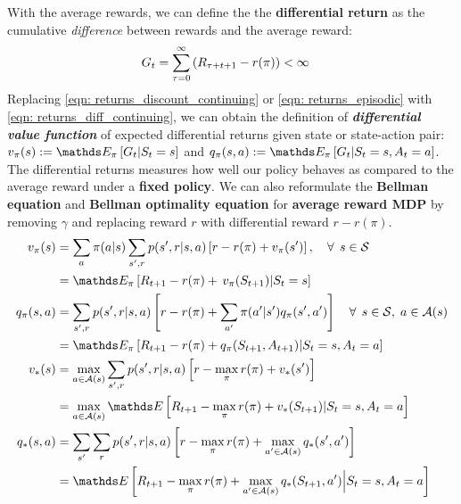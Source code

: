 \documentclass[11pt]{article}
\begin{document}
\begin{itemize}
With the average rewards, we can define the the \textbf{differential return} as the cumulative \emph{difference} between rewards and the average reward:
\begin{align}
G_{t} &= \sum_{\tau=0}^{\infty}\left(R_{\tau+t+1} - r(\pi)\right) < \infty \label{eqn: returns_diff_continuing}
\end{align}  Replacing \eqref{eqn: returns_discount_continuing} or \eqref{eqn: returns_episodic} with \eqref{eqn: returns_diff_continuing}, we can obtain the definition of \textbf{\emph{differential value function}} of expected differential returns given state or state-action pair: $v_{\pi}(s):= \E{\pi}{G_{t}  | S_{t}=s}$ and $q_{\pi}(s, a):= \E{\pi}{G_{t}  | S_{t}=s, A_{t}=a}$.  The differential returns measures how well our policy behaves as compared to the average reward under a \textbf{fixed policy}. We can also reformulate the \textbf{Bellman equation} and \textbf{Bellman optimality equation} for \textbf{average reward MDP} by removing $\gamma$ and replacing reward $r$ with differential reward $r-r(\pi)$.
\begin{align}
v_{\pi}(s) &= \sum_{a}\pi(a|s)\sum_{s', r}p(s', r| s, a)\brac{r - r(\pi) + v_{\pi}(s')}, \quad \forall\,\; s\in \cS \label{eqn: bellman_eqn_value_diff} \\
&= \E{\pi}{R_{t+1} - r(\pi)  + \,v_{\pi}(S_{t+1}) | S_{t} = s} \label{eqn: bellman_eqn_value_diff_2}\\
q_{\pi}(s, a) &=\sum_{s', r}p(s', r|s,a)\brac{r - r(\pi) +  \sum_{a'}\pi(a'|s')q_{\pi}(s', a')} \quad \forall\,\; s\in \cS, \; a\in \cA(s) \label{eqn: bellman_eqn_value_action_diff}\\
&=\E{\pi}{R_{t+1} - r(\pi)  + q_{\pi}(S_{t+1}, A_{t+1}) | S_{t}=s, A_{t}=a}  \label{eqn: bellman_eqn_value_action_diff_2}\\
v_{*}(s) &= \max_{a\in \cA(s)}\sum_{s', r}p(s', r|s, a)\brac{r - \max_{\pi}r(\pi) + v_{*}(s')} \label{eqn: bellman_opt_eqn_value_diff}\\
 &=  \max_{a\in \cA(s)}\E{}{R_{t+1} - \max_{\pi}r(\pi) + v_{*}(S_{t+1}) | S_{t}=s, A_{t}=a} \label{eqn: bellman_opt_eqn_value_diff_2} \\
 q_{*}(s, a) &=\sum_{s'}\sum_{r}p(s', r|s, a)\brac{r  - \max_{\pi}r(\pi) +  \max_{a'\in \cA(s)}q_{*}(s', a')}  \label{eqn: bellman_opt_eqn_value_action_diff}\\
 &=  \E{}{R_{t+1}  - \max_{\pi}r(\pi)+ \max_{a'\in \cA(s)}q_{*}(S_{t+1}, a') \Big| S_{t}=s, A_{t}=a} \label{eqn: bellman_opt_eqn_value_action_diff_2}
\end{align}
\end{itemize}


\newpage


\end{document}
